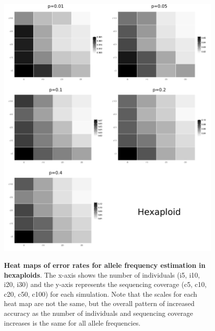 \documentclass[11pt,english,letterpaper,oneside]{article}
\begin{document}
\begin{figure}
\centering
\caption{\textbf{Heat maps of error rates for allele frequency estimation in hexaploids}. The x-axis shows the number of individuals (i5, i10, i20, i30) and the y-axis represents the sequencing coverage (c5, c10, c20, c50, c100) for each simulation. Note that the scales for each heat map  are not the same, but the overall pattern of increased accuracy as the number of individuals and sequencing coverage increases is the same for all allele frequencies.}
\vspace{0.25in}
\includegraphics{fig/figure3-hex-heatmaps}
\label{fig:hex-heatmaps}
\end{figure}
\end{document}
